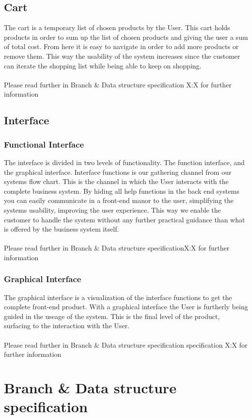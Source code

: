 \documentclass[11pt]{article}
\begin{document}
\subsection{Cart}
The cart is a temporary list of chosen products by the User.  This cart holds products in order to sum up the list of chosen products and giving the user a sum of total cost.
From here it is easy to navigate in order to add more products or remove them. This way the usability of the system increases since the customer can iterate the shopping list while being able to keep on shopping. \\\\
Please read further in Branch \& Data structure specification X:X for further information
\subsection{Interface}
\subsubsection{Functional Interface}
The interface is divided in two levels of functionality. The function interface, and the graphical interface.
Interface functions is our gathering channel from our systems flow chart. This is the channel in which the User interacts with the complete business system. By hiding all help functions in the back end systems you can easily communicate in a front-end manor to the user, simplifying the systems usability, improving the user experience. This way we enable the customer to handle the system without any further practical guidance than what is offered by the business system itself. \\\\
Please read further in Branch \& Data structure specificationX:X for further information
\subsubsection{Graphical Interface}
The graphical interface is a visualization of the interface functions to get the complete front-end product. With a graphical interface the User is furtherly being guided in the useage of the system. This is the final level of the product, surfacing to the interaction with the User.\\\\
Please read further in Branch \& Data structure specification specification X:X for further information
\section{Branch \& Data structure specification}
\end{document}
